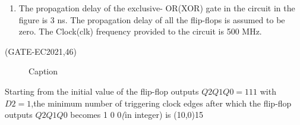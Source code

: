 \documentclass[tikz]{standalone}
\begin{document}
\begin{enumerate}
\item The propagation delay of the exclusive- OR(XOR) gate in the circuit in the figure is 3 ns. The propagation delay of all the flip-flops is assumed to be zero. The Clock(clk) frequency provided to the circuit is 500 MHz.
\end{enumerate}
\hfill(GATE-EC2021,46)
\begin{figure}
    \centering
    
    \caption{Caption}
    \label{fig:enter-label}
\end{figure}
Starting from the initial value of the flip-flop outputs $Q2Q1Q0 =1 1 1$ with $D2=1$,the minimum number of triggering clock edges after which the flip-flop outputs $Q2Q1Q0$ becomes 1 0 0\emph (in integer) is \line(10,0){15}
\end{document}
